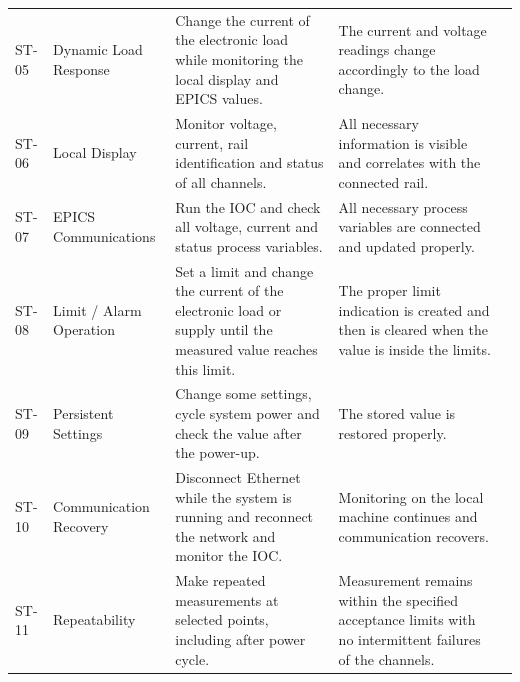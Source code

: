 \begin{Form}
\begin{longtable}{
			p{}
			p{}
			p{}
			p{}
			p{}
		}
		\addlinespace[0.4em]
		
		ST-05 &
		Dynamic Load Response &
		Change the current of the electronic load while monitoring the local display
		and EPICS values. &
		The current and voltage readings change accordingly to the load change. &
		\testresult{ST05} \\
		
		\addlinespace[0.4em]
		
		ST-06 &
		Local Display &
		Monitor voltage, current, rail identification and status of all channels. &
		All necessary information is visible and correlates with the connected rail. &
		\testresult{ST06} \\
		
		\addlinespace[0.4em]
		
		ST-07 &
		EPICS Communications &
		Run the IOC and check all voltage, current and status process variables. &
		All necessary process variables are connected and updated properly. &
		\testresult{ST07} \\
		
		\addlinespace[0.4em]
		
		ST-08 &
		Limit / Alarm Operation &
		Set a limit and change the current of the electronic load or supply until the
		measured value reaches this limit. &
		The proper limit indication is created and then is cleared when the value is
		inside the limits. &
		\testresult{ST08} \\
		
		\addlinespace[0.4em]
		
		ST-09 &
		Persistent Settings &
		Change some settings, cycle system power and check the value after the
		power-up. &
		The stored value is restored properly. &
		\testresult{ST09} \\
		
		\addlinespace[0.4em]
		
		ST-10 &
		Communication Recovery &
		Disconnect Ethernet while the system is running and reconnect the network and
		monitor the IOC. &
		Monitoring on the local machine continues and communication recovers. &
		\testresult{ST10} \\
		
		\addlinespace[0.4em]
		
		ST-11 &
		Repeatability &
		Make repeated measurements at selected points, including after power cycle. &
		Measurement remains within the specified acceptance limits with no
		intermittent failures of the channels. &
		\testresult{ST11} \\
		

\end{longtable}
\end{Form}

